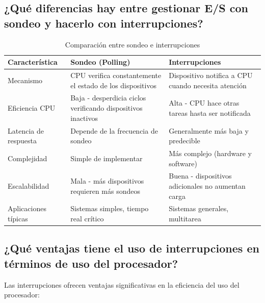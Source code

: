 \documentclass[12pt]{article}
\begin{document}
\subsection{¿Qué diferencias hay entre gestionar E/S con sondeo y hacerlo con interrupciones?}

\begin{table}[h]
	\centering
	\begin{tabular}{|p{4cm}|p{5cm}|p{5cm}|}
		\hline
		\textbf{Característica} & \textbf{Sondeo (Polling)} & \textbf{Interrupciones} \\
		\hline
		Mecanismo & CPU verifica constantemente el estado de los dispositivos & Dispositivo notifica a CPU cuando necesita atención \\
		\hline
		Eficiencia CPU & Baja - desperdicia ciclos verificando dispositivos inactivos & Alta - CPU hace otras tareas hasta ser notificada \\
		\hline
		Latencia de respuesta & Depende de la frecuencia de sondeo & Generalmente más baja y predecible \\
		\hline
		Complejidad & Simple de implementar & Más complejo (hardware y software) \\
		\hline
		Escalabilidad & Mala - más dispositivos requieren más sondeos & Buena - dispositivos adicionales no aumentan carga \\
		\hline
		Aplicaciones típicas & Sistemas simples, tiempo real crítico & Sistemas generales, multitarea \\
		\hline
	\end{tabular}
	\caption{Comparación entre sondeo e interrupciones}
\end{table}

\subsection{¿Qué ventajas tiene el uso de interrupciones en términos de uso del procesador?}

Las interrupciones ofrecen ventajas significativas en la eficiencia del uso del procesador:
\end{document}
